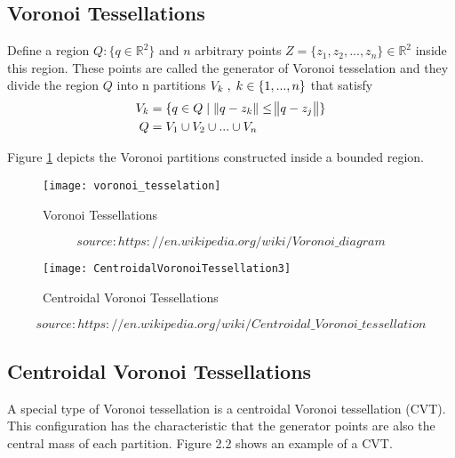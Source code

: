 \subsection{Voronoi Tessellations}
Define a region ${Q: \{q \in \mathbb{R}^2\}}$ and ${n}$ arbitrary points ${Z = \{z_1, z_2, ..., z_n\} \in \mathbb{R}^2 }$ inside this region. These points are called the generator of Voronoi tesselation and they divide the region ${Q}$ into n partitions ${V_k \txtspc{,} k \in \{1,...,n\}}$ that satisfy \\ 
\begin{equation}
\begin{split}
V_k & = \{q \in Q \txtspc{|} \norm{q-z_k} \leq \norm{q-z_j} \} \\
Q & = V_1 \cup V_2 \cup ... \cup V_n
\end{split}
\end{equation}

\noindent Figure \ref{fig:Voronoi_Tessellation} depicts the Voronoi partitions constructed inside a bounded region.

\begin{figure}[!htb]
	\centering
	\texttt{[image: voronoi\_tesselation]}
	\caption{Voronoi Tessellations}
	\label{fig:Voronoi_Tessellation}
\end{figure}
\[source: https://en.wikipedia.org/wiki/Voronoi\_diagram\]

\begin{figure}[!htb]
	\centering
	\texttt{[image: CentroidalVoronoiTessellation3]}
	\label{fig:CentroidalVoronoiTessellation}
	\caption{Centroidal Voronoi Tessellations}
\end{figure} 	
\[source:https://en.wikipedia.org/wiki/Centroidal\_Voronoi\_tessellation\]

\subsection{Centroidal Voronoi Tessellations}
A special type of Voronoi tessellation is a centroidal Voronoi tessellation (CVT). This configuration has the characteristic that the generator points are also the central mass of each partition. Figure 2.2 shows an example of a CVT.

